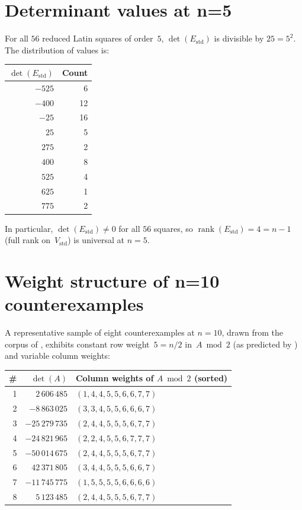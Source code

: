 \documentclass[11pt,a4paper]{article}
\newcommand{\rank}{\operatorname{rank}}
\newcommand{\Estd}{E_{\mathrm{std}}}
\newcommand{\Vstd}{V_{\mathrm{std}}}
\begin{document}
\appendix
\section{Determinant values at n=5}\label{app:n5}

For all $56$ reduced Latin squares of order~$5$, $\det(\Estd)$ is
divisible by $25=5^2$.  The distribution of values is:

\begin{center}
\begin{tabular}{rr}
  \toprule
  $\det(\Estd)$ & Count \\
  \midrule
  $-525$ & 6 \\
  $-400$ & 12 \\
  $-25$ & 16 \\
  $25$ & 5 \\
  $275$ & 2 \\
  $400$ & 8 \\
  $525$ & 4 \\
  $625$ & 1 \\
  $775$ & 2 \\
  \bottomrule
\end{tabular}
\end{center}

\noindent
In particular, $\det(\Estd)\ne 0$ for all $56$ squares, so
$\rank(\Estd)=4=n-1$ (full rank on~$\Vstd$) is universal at $n=5$.

\section{Weight structure of n=10 counterexamples}\label{app:weights}

A representative sample of eight counterexamples at $n=10$, drawn from
the corpus of , exhibits constant row weight~$5=n/2$
in~$A\bmod 2$ (as predicted by ) and variable
column weights:

\begin{center}
\begin{tabular}{rrl}
  \toprule
  \# & $\det(A)$ & Column weights of $A\bmod 2$ (sorted) \\
  \midrule
  1 & $2\,606\,485$ & $(1,4,4,5,5,6,6,7,7)$ \\
  2 & $-8\,863\,025$ & $(3,3,4,5,5,6,6,6,7)$ \\
  3 & $-25\,279\,735$ & $(2,4,4,5,5,5,6,7,7)$ \\
  4 & $-24\,821\,965$ & $(2,2,4,5,5,6,7,7,7)$ \\
  5 & $-50\,014\,675$ & $(2,4,4,5,5,5,6,7,7)$ \\
  6 & $42\,371\,805$ & $(3,4,4,5,5,5,6,6,7)$ \\
  7 & $-11\,745\,775$ & $(1,5,5,5,5,6,6,6,6)$ \\
  8 & $5\,123\,485$ & $(2,4,4,5,5,5,6,7,7)$ \\
  \bottomrule
\end{tabular}
\end{center}
\end{document}
